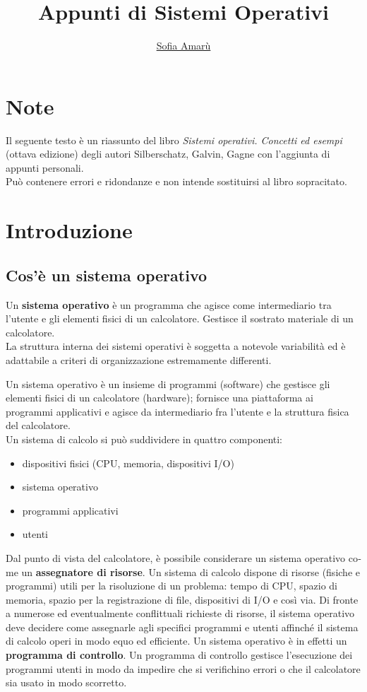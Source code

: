\documentclass[11pt,a4paper]{article}
\begin{document}
\title{Appunti di Sistemi Operativi}
\author{\href{https://t.me/amarusofia}{Sofia Amarù}}
\maketitle
\tableofcontents

\section*{Note}
Il seguente testo è un riassunto del libro \emph{Sistemi operativi. Concetti ed esempi} (ottava edizione) degli autori Silberschatz, Galvin, Gagne con l'aggiunta di appunti personali.\\ Può contenere errori e ridondanze e non intende sostituirsi al libro sopracitato.

\section{Introduzione}
\subsection{Cos'è un sistema operativo}
Un \textbf{sistema operativo} è un programma che agisce come intermediario tra l'utente e gli
ele­menti fisici di un calcolatore. Gestisce il sostrato materiale di un calcolato­re.\\
La struttura interna dei sistemi operativi è soggetta a notevole variabilità ed è
adatta­bile a criteri di organizzazione estremamente differenti.

Un sistema operativo è un insieme di programmi (software) che gestisce gli elementi fisici di
un calcolatore (hardware); fornisce una piattaforma ai programmi applicativi e agisce da
intermediario fra l'utente e la struttura fisica del calcolatore.
\medskip\\
Un sistema di calcolo si può suddividere in quattro componenti:
\begin{itemize}[noitemsep]
  \item dispositivi fisici (CPU, memoria, dispositivi I/O)
  \item sistema operativo
  \item programmi applicativi
  \item utenti
\end{itemize}
Dal punto di vista del calcolatore, è possibile considerare un sistema operativo
co­me un \textbf{assegnatore di risorse}. Un sistema di calcolo dispone di risorse (fisiche e programmi)
utili per la risoluzione di un problema: tempo di CPU, spazio di memoria, spazio per la
regi­strazione di file, dispositivi di I/O e così via. Di fronte a numerose ed eventualmente conflittuali richieste di risorse, il sistema operativo deve decidere come assegnarle agli specifici programmi e utenti affinché il sistema di calcolo operi in modo equo ed efficiente. Un sistema operativo è in effetti un
\textbf{pro­gramma di controllo}. Un programma di controllo gestisce l'esecuzione dei programmi
uten­ti in modo da impedire che si verifichino errori o che il calcolatore sia usato in modo scor­retto.
\end{document}
